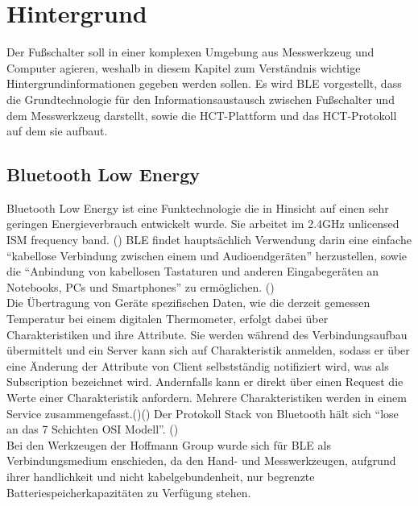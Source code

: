 \section{Hintergrund}
Der Fußschalter soll in einer komplexen Umgebung aus Messwerkzeug und Computer agieren, weshalb in diesem Kapitel zum Verständnis wichtige Hintergrundinformationen gegeben werden sollen. Es wird \ac{BLE} vorgestellt, dass die Grundtechnologie für den Informationsaustausch zwischen Fußschalter und dem Messwerkzeug darstellt, sowie die \ac{HCT}-Plattform und das \ac{HCT}-Protokoll auf dem sie aufbaut.

\subsection{Bluetooth Low Energy}
Bluetooth Low Energy ist eine Funktechnologie die in Hinsicht auf einen sehr geringen Energieverbrauch entwickelt wurde. Sie arbeitet im 2.4GHz unlicensed ISM frequency band. (\cite[]{Bluetooth_Wireless_Technology}) \ac{BLE} findet hauptsächlich Verwendung darin eine einfache ``kabellose Verbindung zwischen einem und Audioendgeräten'' herzustellen, sowie die ``Anbindung von kabellosen Tastaturen und anderen Eingabegeräten an Notebooks, PCs und Smartphones'' zu ermöglichen. (\cite[S. 339]{Grundkurs_mobile_Kommunikation})\\
Die Übertragung von Geräte spezifischen Daten, wie die derzeit gemessen Temperatur bei einem digitalen Thermometer, erfolgt dabei über Charakteristiken und ihre Attribute. Sie werden während des Verbindungsaufbau übermittelt und ein Server kann sich auf Charakteristik anmelden, sodass er über eine Änderung der Attribute von Client selbstständig notifiziert wird, was als Subscription bezeichnet wird. Andernfalls kann er direkt über einen Request die Werte einer Charakteristik anfordern. Mehrere Charakteristiken werden in einem Service zusammengefasst.(\cite[S. 282]{Bluetooth_Core_Specification})(\cite[]{Overview_and_Evaluation_of_BLE}) Der Protokoll Stack von Bluetooth hält sich ``lose an das 7 Schichten OSI Modell''. (\cite[S. 347]{Grundkurs_mobile_Kommunikation})\\
Bei den Werkzeugen der Hoffmann Group wurde sich für \ac{BLE} als Verbindungsmedium enschieden, da den Hand- und Messwerkzeugen, aufgrund ihrer handlichkeit und nicht kabelgebundenheit, nur begrenzte Batteriespeicherkapazitäten zu Verfügung stehen.

